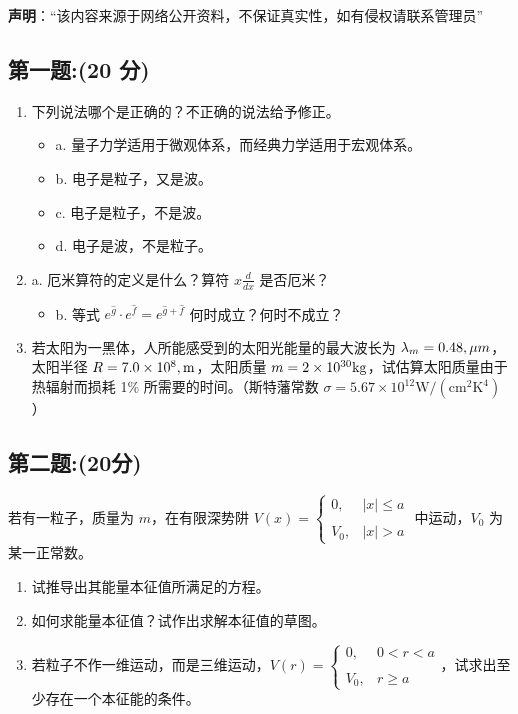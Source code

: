 
\textbf{声明}：“该内容来源于网络公开资料，不保证真实性，如有侵权请联系管理员”

\subsection{第一题:(20 分)}
\begin{enumerate}
  \item 下列说法哪个是正确的？不正确的说法给予修正。
  \begin{itemize}
    \item a. 量子力学适用于微观体系，而经典力学适用于宏观体系。
    \item b. 电子是粒子，又是波。
    \item c. 电子是粒子，不是波。
    \item d. 电子是波，不是粒子。
  \end{itemize}
  
  \item a. 厄米算符的定义是什么？算符 $x \frac{d}{dx}$ 是否厄米？
  \begin{itemize}
    \item b. 等式 $e^{\hat g} \cdot e^{\hat f} = e^{\hat g+\hat f}$ 何时成立？何时不成立？
  \end{itemize}
  
  \item 若太阳为一黑体，人所能感受到的太阳光能量的最大波长为 $\lambda_m = 0.48 \\, \mu m$，太阳半径 $R = 7.0 \times 10^8 \\, \text{m}$，太阳质量 $m = 2 \times 10^{30} \\ \text{kg}$，试估算太阳质量由于热辐射而损耗 1\% 所需要的时间。（斯特藩常数 $\sigma = 5.67 \times 10^{12}  \text{W} / (\text{cm}^2  \text{K}^4)$）
\end{enumerate}
\subsection{第二题:(20分)}
若有一粒子，质量为 $m$，在有限深势阱 $V(x) = \begin{cases}
0, & |x| \leq a \\\\
V_0, & |x| > a
\end{cases}$ 中运动，$V_0$ 为某一正常数。

\begin{enumerate}
  \item 试推导出其能量本征值所满足的方程。
  \item 如何求能量本征值？试作出求解本征值的草图。
  \item 若粒子不作一维运动，而是三维运动，$V(r) = \begin{cases}
0, & 0 < r < a \\\\
V_0, & r \geq a
\end{cases}$，试求出至少存在一个本征能的条件。
\end{enumerate}